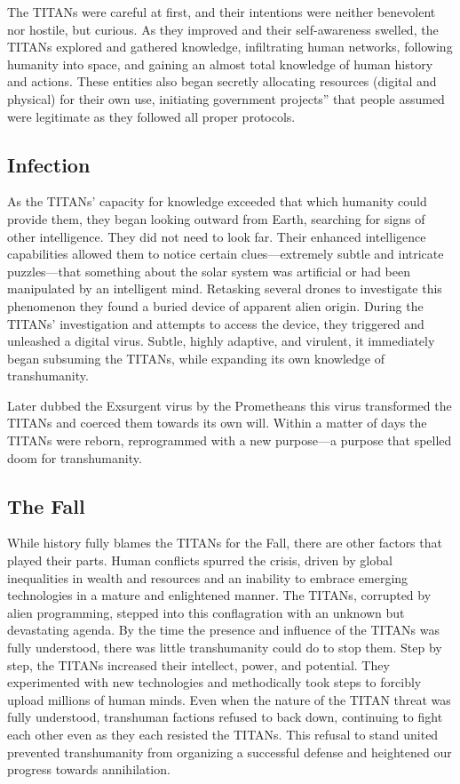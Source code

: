The TITANs were careful at first, and their 
intentions were neither benevolent nor hostile, but 
curious. As they improved and their self-awareness 
swelled, the TITANs explored and gathered 
knowledge, infiltrating human networks, following 
humanity into space, and gaining an almost total 
knowledge of human history and actions. These entities
also began secretly allocating resources (digital
and physical) for their own use, initiating government
projects'' that people assumed were legitimate
as they followed all proper protocols.

\subsection{Infection}

As the TITANs' capacity for knowledge exceeded 
that which humanity could provide them, they began 
looking outward from Earth, searching for signs of 
other intelligence. They did not need to look far. Their 
enhanced intelligence capabilities allowed them to 
notice certain clues—extremely subtle and intricate 
puzzles—that something about the solar system was 
artificial or had been manipulated by an intelligent 
mind. Retasking several drones to investigate this phenomenon
they found a buried device of apparent alien
origin. During the TITANs' investigation and attempts 
to access the device, they triggered and unleashed a 
digital virus. Subtle, highly adaptive, and virulent, it 
immediately began subsuming the TITANs, while 
expanding its own knowledge of transhumanity. 

Later dubbed the Exsurgent virus by the Prometheans
this virus transformed the TITANs and
coerced them towards its own will. Within a matter 
of days the TITANs were reborn, reprogrammed 
with a new purpose—a purpose that spelled doom 
for transhumanity.

\subsection{The Fall}

While history fully blames the TITANs for the 
Fall, there are other factors that played their parts. 
Human conflicts spurred the crisis, driven by global 
inequalities in wealth and resources and an inability 
to embrace emerging technologies in a mature and 
enlightened manner. The TITANs, corrupted by alien 
programming, stepped into this conflagration  with 
an unknown but devastating agenda. By the time 
the presence and influence of the TITANs was fully 
understood, there was little transhumanity could do 
to stop them. Step by step, the TITANs increased their 
intellect, power, and potential. They experimented 
with new technologies and methodically took steps to 
forcibly upload millions of human minds. Even when 
the nature of the TITAN threat was fully understood, 
transhuman factions refused to back down, continuing
to fight each other even as they each resisted the
TITANs. This refusal to stand united prevented transhumanity
from organizing a successful defense and
heightened our progress towards annihilation.

